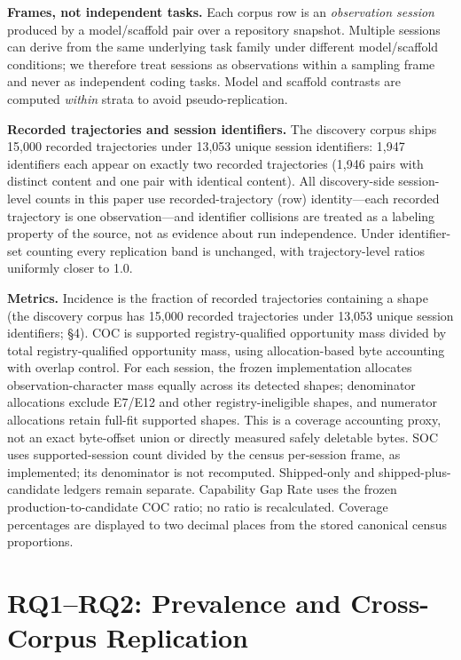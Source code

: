﻿\documentclass[sigconf,balance=false]{acmart}
\begin{document}
\textbf{Frames, not independent tasks.} Each corpus row is an \emph{observation session} produced by a model/scaffold pair over a repository snapshot. Multiple sessions can derive from the same underlying task family under different model/scaffold conditions; we therefore treat sessions as observations within a sampling frame and never as independent coding tasks. Model and scaffold contrasts are computed \emph{within} strata to avoid pseudo-replication.

\textbf{Recorded trajectories and session identifiers.} The discovery corpus ships 15{,}000 recorded trajectories under 13{,}053 unique session identifiers: 1{,}947 identifiers each appear on exactly two recorded trajectories (1,946 pairs with distinct content and one pair with identical content). All discovery-side session-level counts in this paper use recorded-trajectory (row) identity---each recorded trajectory is one observation---and identifier collisions are treated as a labeling property of the source, not as evidence about run independence. Under identifier-set counting every replication band is unchanged, with trajectory-level ratios uniformly closer to 1.0.

\textbf{Metrics.} Incidence is the fraction of recorded trajectories containing a shape (the discovery corpus has 15,000 recorded trajectories under 13,053 unique session identifiers; \S4). COC is supported registry-qualified opportunity mass divided by total registry-qualified opportunity mass, using allocation-based byte accounting with overlap control. For each session, the frozen implementation allocates observation-character mass equally across its detected shapes; denominator allocations exclude E7/E12 and other registry-ineligible shapes, and numerator allocations retain full-fit supported shapes. This is a coverage accounting proxy, not an exact byte-offset union or directly measured safely deletable bytes. SOC uses supported-session count divided by the census per-session frame, as implemented; its denominator is not recomputed. Shipped-only and shipped-plus-candidate ledgers remain separate. Capability Gap Rate uses the frozen production-to-candidate COC ratio; no ratio is recalculated. Coverage percentages are displayed to two decimal places from the stored canonical census proportions.

\section{RQ1--RQ2: Prevalence and Cross-Corpus Replication}
\end{document}
